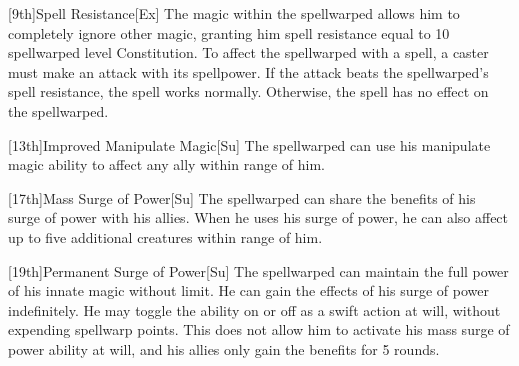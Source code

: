 [9th]{Spell Resistance}[Ex]
The magic within the spellwarped allows him to completely ignore other magic, granting him spell resistance equal to 10 \add spellwarped level \add Constitution.
To affect the spellwarped with a spell, a caster must make an attack with its spellpower.
If the attack beats the spellwarped's spell resistance, the spell works normally.
Otherwise, the spell has no effect on the spellwarped.

[13th]{Improved Manipulate Magic}[Su]
The spellwarped can use his manipulate magic ability to affect any ally within \rngmed range of him.

[17th]{Mass Surge of Power}[Su]
The spellwarped can share the benefits of his surge of power with his allies.
When he uses his surge of power, he can also affect up to five additional creatures within \rngmed range of him.

[19th]{Permanent Surge of Power}[Su]
The spellwarped can maintain the full power of his innate magic without limit.
He can gain the effects of his surge of power indefinitely.
He may toggle the ability on or off as a swift action at will, without expending spellwarp points.
This does not allow him to activate his mass surge of power ability at will, and his allies only gain the benefits for 5 rounds.

\label{Spellwarped Powers}

